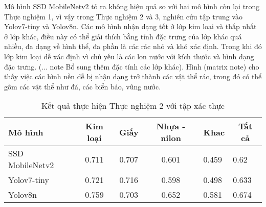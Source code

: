 \documentclass[../the.tex]{subfiles}
\begin{document}
\bigskip

{\fontsize{13}{12} \selectfont
    Mô hình SSD MobileNetv2 tỏ ra không hiệu quả so với hai mô hình còn lại trong Thực nghiệm 1, vì vậy trong Thực nghiệm 2 và 3, nghiên cứu tập trung vào Yolov7-tiny và Yolov8n.
    Các mô hình nhận dạng tốt ở lớp kim loại và thấp nhất ở lớp khác,
    điều này có thể giải thích bằng tính đặc trưng của lớp khác quá nhiều, đa dạng về hình thể, đa phần là các rác nhỏ và khó xác định.
    Trong khi đó lớp kim loại dễ xác định vì chủ yếu là các lon nước với kích thước và hình dạng đặc trưng. (... note Bổ sung thêm đặc tính các lớp khác).
    Hình (matrix note) cho thấy việc các hình nền dễ bị nhận dạng trở thành các vật thể rác, trong đó có thể gồm các vật thể như đá, các biển báo, vũng nước.
}
\begin{table}[h!]
    \centering
    \caption{Kết quả thực hiện Thực nghiệm 2 với tập xác thực}
    \begin{tabular}{|l|c|c|c|l|l|}
        \hline
        \textbf{Mô hình}  & \textbf{Kim loại}          & \textbf{Giấy}              & \textbf{Nhựa - nilon}      & \multicolumn{1}{c|}{\textbf{Khac}} & \multicolumn{1}{c|}{\textbf{Tất cả}} \\ \hline
        SSD   MobileNetv2 & 0.711                      & 0.707                      & 0.601                      & 0.459                              & 0.62                               \\ \hline
        Yolov7-tiny       & 0.721                      & 0.716                      & 0.598                      & 0.498                              & 0.633                                \\ \hline
        Yolov8n           & 0.759                      & 0.703                      & 0.652                      & 0.581                              & 0.674                                \\ \hline
    \end{tabular}
    \label{tab:thucnghiem2.1}
\end{table}
\end{document}
